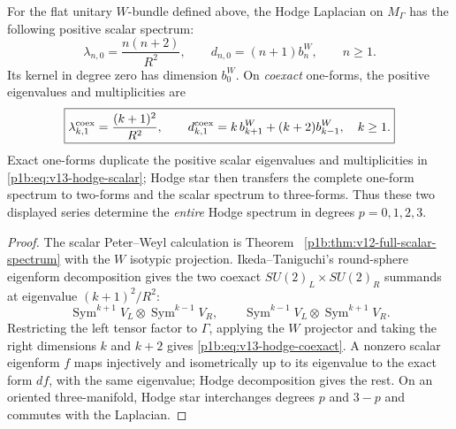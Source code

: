 \documentclass[11pt]{article}
\begin{document}
\begin{theorem}
\label{p1b:thm:v13-hodge-spectra}
For the flat unitary $W$-bundle defined above, the Hodge Laplacian
on $M_\Gamma$ has the following positive scalar spectrum:
\begin{equation}
\label{p1b:eq:v13-hodge-scalar}
 \lambda_{n,0}=\frac{n(n+2)}{R^2},\qquad
 d_{n,0}=(n+1)b_n^W,\qquad n\ge1.
\end{equation}
Its kernel in degree zero has dimension $b_0^W$.
On \emph{coexact} one-forms, the positive eigenvalues and
multiplicities are
\begin{equation}
\label{p1b:eq:v13-hodge-coexact}
 \boxed{\lambda_{k,1}^{\rm coex}=\frac{(k+1)^2}{R^2},\qquad
 d_{k,1}^{\rm coex}=k\,b_{k+1}^W+(k+2)b_{k-1}^W,
 \quad k\ge1.}
\end{equation}
Exact one-forms duplicate the positive scalar eigenvalues and
multiplicities in \eqref{p1b:eq:v13-hodge-scalar}; Hodge star then
transfers the complete one-form spectrum to two-forms and the scalar
spectrum to three-forms. Thus these two displayed series determine
the \emph{entire} Hodge spectrum in degrees $p=0,1,2,3$.
\end{theorem}
\begin{proof}
The scalar Peter--Weyl calculation is Theorem~
\ref{p1b:thm:v12-full-scalar-spectrum} with the $W$ isotypic
projection.  Ikeda--Taniguchi's round-sphere eigenform decomposition
\cite{ikedaTaniguchi1978eigenforms} gives the two coexact
$SU(2)_L\times SU(2)_R$ summands at eigenvalue
$(k+1)^2/R^2$:
\[
 \operatorname{Sym}^{k+1}V_L\otimes\operatorname{Sym}^{k-1}V_R,
 \qquad
 \operatorname{Sym}^{k-1}V_L\otimes\operatorname{Sym}^{k+1}V_R.
\]
Restricting the left tensor factor to $\Gamma$, applying the
$W$ projector and taking the right dimensions $k$ and $k+2$
gives \eqref{p1b:eq:v13-hodge-coexact}.  A nonzero scalar eigenform
$f$ maps injectively and isometrically up to its eigenvalue to the
exact form $df$, with the same eigenvalue; Hodge decomposition gives
the rest. On an oriented three-manifold, Hodge star interchanges
degrees $p$ and $3-p$ and commutes with the Laplacian.
\end{proof}
\end{document}
